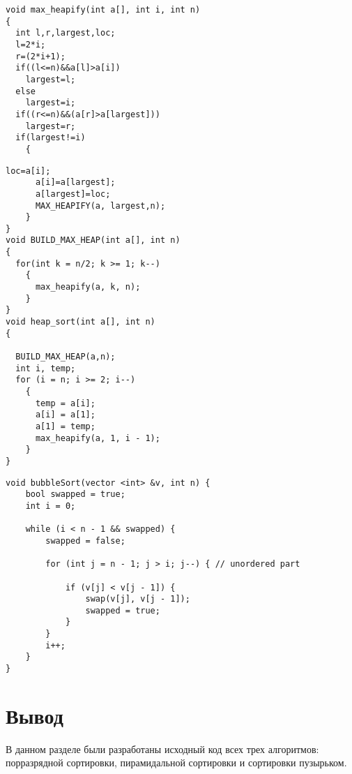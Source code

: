 \begin{lstlisting}[caption=Алгоритм пирамидальной сортировки]
void max_heapify(int a[], int i, int n)
{
  int l,r,largest,loc;
  l=2*i;
  r=(2*i+1);
  if((l<=n)&&a[l]>a[i])
    largest=l;
  else
    largest=i;
  if((r<=n)&&(a[r]>a[largest]))
    largest=r;
  if(largest!=i)
    {
    \end{lstlisting}
\begin{lstlisting}[caption=Алгоритм пирамидальной сортировки]
      loc=a[i];
      a[i]=a[largest];
      a[largest]=loc;
      MAX_HEAPIFY(a, largest,n);
    }
}
void BUILD_MAX_HEAP(int a[], int n)
{
  for(int k = n/2; k >= 1; k--)
    {
      max_heapify(a, k, n);
    }
}
void heap_sort(int a[], int n)
{

  BUILD_MAX_HEAP(a,n);
  int i, temp;
  for (i = n; i >= 2; i--)
    {
      temp = a[i];
      a[i] = a[1];
      a[1] = temp;
      max_heapify(a, 1, i - 1);
    }
}
\end{lstlisting}
\newpage
\begin{lstlisting}[caption=алгоритм пузырьковой сортировки]
      void bubbleSort(vector <int> &v, int n) {
	bool swapped = true;
	int i = 0;

	while (i < n - 1 && swapped) {
		swapped = false;
		
		for (int j = n - 1; j > i; j--) { // unordered part
			
			if (v[j] < v[j - 1]) {
				swap(v[j], v[j - 1]);
				swapped = true;
			}
		}
		i++;
	}
}
\end{lstlisting}
 
\section{Вывод}

В данном разделе были разработаны исходный код всех трех алгоритмов: порразрядной сортировки, пирамидальной сортировки и сортировки пузырьком. 

